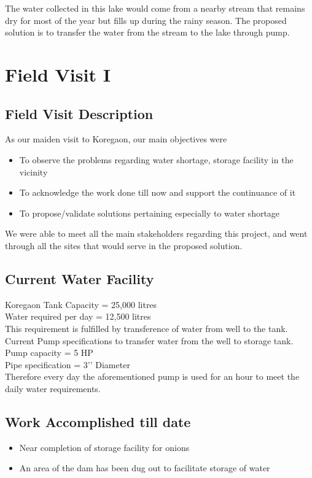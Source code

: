 \documentclass{article}
\begin{document}
The water collected in this lake would come from a nearby stream that remains dry for most of the year but fills up during the rainy season. The proposed solution is to transfer the water from the stream to the lake through pump.

\section{Field Visit I}
\subsection{Field Visit Description}
As our maiden visit to Koregaon, our main objectives were
\begin{itemize}
  \item To observe the problems regarding water shortage, storage facility in the vicinity
  \item To acknowledge the work done till now and support the continuance of it
  \item To propose/validate solutions pertaining especially to water shortage
\end{itemize}
We were able to meet all the main stakeholders regarding this project, and went through all the sites that would serve in the proposed solution.

\subsection{Current Water Facility}
Koregaon Tank Capacity = 25,000 litres
\\
Water required per day = 12,500 litres
\\
This requirement is fulfilled by transference of water from well to the tank. Current Pump specifications to transfer water from the well to storage tank.
\\
Pump capacity = 5 HP
\\
Pipe specification = 3’’ Diameter
\\
Therefore every day the aforementioned pump is used for an hour to meet the daily water requirements.

\subsection{Work Accomplished till date}
\begin{itemize}
\item Near completion of storage facility for onions
\item An area of the dam has been dug out to facilitate storage of water
\end{itemize}
\end{document}

